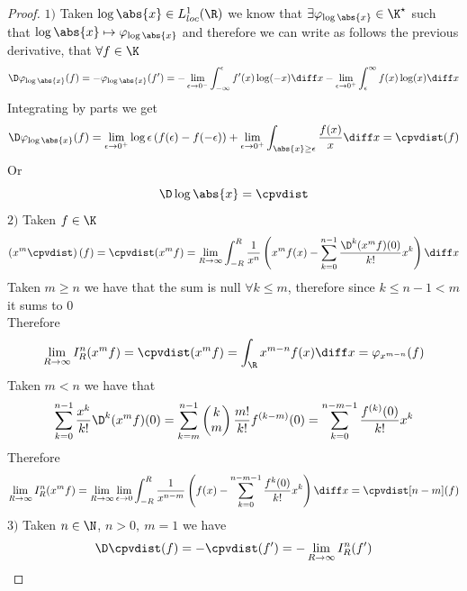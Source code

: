 \documentclass[../mmf.tex]{subfiles}
\begin{document}
\begin{proof}
	$1)$ Taken $\log\abs{x}\in L^1_{loc}(\R)$ we know that $\exists\varphi_{\log\abs{x}}\in\K^\star$ such that $\log\abs{x}\mapsto\varphi_{\log\abs{x}}$ and therefore we can write as follows the previous derivative, that $\forall f\in\K$
	\begin{equation*}
		\D\varphi_{\log\abs{x}}(f)=-\varphi_{\log\abs{x}}(f')=-\lim_{\epsilon\to0^-}\int_{-\infty}^{\epsilon}f'(x)\log(-x)\diff x-\lim_{\epsilon\to0^+}\int_{\epsilon}^{\infty}f(x)\log(x)\diff x
	\end{equation*}
	Integrating by parts we get
	\begin{equation*}
		\D\varphi_{\log\abs{x}}(f)=\lim_{\epsilon\to0^+}\log\epsilon\left( f(\epsilon)-f(-\epsilon) \right)+\lim_{\epsilon\to0^+}\int_{\abs{x}\ge\epsilon}^{}\frac{f(x)}{x}\diff x=\cpvdist(f)
	\end{equation*}
	Or
	\begin{equation*}
		\D\log\abs{x}=\cpvdist
	\end{equation*}
	$2)$ Taken $f\in\K$
	\begin{equation*}
		\left( x^m\cpvdist \right)(f)=\cpvdist(x^mf)=\lim_{R\to\infty}\int_{-R}^{R}\frac{1}{x^n}\left( x^mf(x)-\sum_{k=0}^{n-1}\frac{\D^k(x^mf)(0)}{k!}x^k \right)\diff x
	\end{equation*}
	Taken $m\ge n$ we have that the sum is null $\forall k\le m$, therefore since $k\le n-1<m$ it sums to $0$\\
	Therefore
	\begin{equation*}
		\lim_{R\to\infty}I_R^n(x^mf)=\cpvdist(x^mf)=\int_{\R}^{}x^{m-n}f(x)\diff x=\varphi_{x^{m-n}}(f)
	\end{equation*}
	Taken $m<n$ we have that
	\begin{equation*}
		\sum_{k=0}^{n-1}\frac{x^k}{k!}\D^k(x^mf)(0)=\sum_{k=m}^{n-1}\begin{pmatrix}k\\m\end{pmatrix}\frac{m!}{k!}f^{(k-m)}(0)=\sum_{k=0}^{n-m-1}\frac{f^{(k)}(0)}{k!}x^k
	\end{equation*}
	Therefore
	\begin{equation*}
		\lim_{R\to\infty}I_R^n(x^mf)=\lim_{R\to\infty}\lim_{\epsilon\to0}\int_{-R}^{R}\frac{1}{x^{n-m}}\left( f(x)-\sum_{k=0}^{n-m-1}\frac{f^{k}(0)}{k!}x^k \right)\diff x=\cpvdist[n-m](f)
	\end{equation*}
	$3)$ Taken $n\in\N$, $n>0,\ m=1$ we have
	\begin{equation*}
		\D\cpvdist(f)=-\cpvdist(f')=-\lim_{R\to\infty}I_R^n(f')

\end{equation*}
\end{proof}
\end{document}
